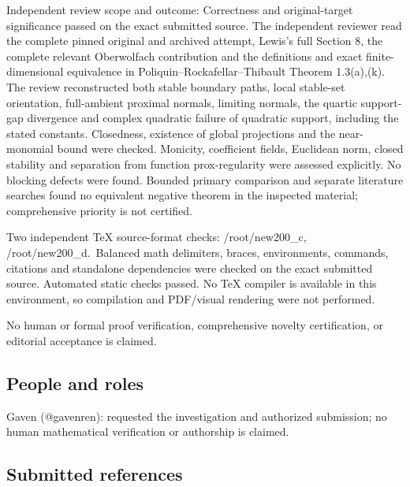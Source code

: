 \documentclass[11pt]{article}
\begin{document}
Independent review scope and outcome: Correctness and original-target significance passed on the exact submitted source. The independent reviewer read the complete pinned original and archived attempt, Lewis's full Section 8, the complete relevant Oberwolfach contribution and the definitions and exact finite-dimensional equivalence in Poliquin--Rockafellar--Thibault Theorem 1.3(a),(k). The review reconstructed both stable boundary paths, local stable-set orientation, full-ambient proximal normals, limiting normals, the quartic support-gap divergence and complex quadratic failure of quadratic support, including the stated constants. Closedness, existence of global projections and the near-monomial bound were checked. Monicity, coefficient fields, Euclidean norm, closed stability and separation from function prox-regularity were assessed explicitly. No blocking defects were found. Bounded primary comparison and separate literature searches found no equivalent negative theorem in the inspected material; comprehensive priority is not certified.

Two independent TeX source-format checks: /root/new200\_c, /root/new200\_d.~Balanced math delimiters, braces, environments, commands, citations and standalone dependencies were checked on the exact submitted source. Automated static checks passed. No TeX compiler is available in this environment, so compilation and PDF/visual rendering were not performed.

No human or formal proof verification, comprehensive novelty certification, or editorial acceptance is claimed.

\subsection{People and roles}

Gaven (@gavenren): requested the investigation and authorized submission; no human mathematical verification or authorship is claimed.

\subsection{Submitted references}
\end{document}
